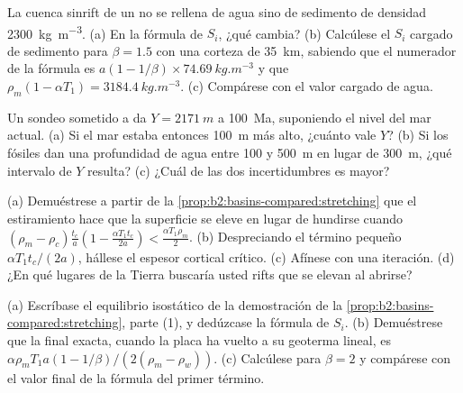\begin{exercise}[$\star\star$]\label{exo:b2:basins-compared:8}
La cuenca sinrift de un  no se rellena de agua sino de sedimento de densidad
\qty{2300}{kg.m^{-3}}. (a) En la fórmula de $S_i$, ¿qué cambia? (b) Calcúlese el $S_i$ cargado de sedimento
para $\beta = 1.5$ con una corteza de \qty{35}{km}, sabiendo que el numerador de la fórmula es
$a(1 - 1/\beta)\times\qty{74.69}{kg.m^{-3}}$ y que $\rho_m(1 - \alpha T_1) =
\qty{3184.4}{kg.m^{-3}}$. (c) Compárese con el valor cargado de agua.
\end{exercise}

\begin{exercise}[$\star\star$]\label{exo:b2:basins-compared:9}
Un sondeo sometido a  da $Y = \qty{2171}{m}$ a \qty{100}{Ma}, suponiendo el nivel del mar actual. (a)
Si el mar estaba entonces \qty{100}{m} más alto, ¿cuánto vale $Y$? (b) Si los fósiles dan una profundidad de agua
entre 100 y \qty{500}{m} en lugar de \qty{300}{m}, ¿qué intervalo de $Y$ resulta? (c) ¿Cuál de las
dos incertidumbres es mayor?
\end{exercise}

\begin{exercise}[$\star\star\star$]\label{exo:b2:basins-compared:10}
(a) Demuéstrese a partir de la \cref{prop:b2:basins-compared:stretching} que el estiramiento hace que la superficie se eleve
en lugar de hundirse cuando $(\rho_m - \rho_c)\frac{t_c}{a}\left(1 - \frac{\alpha T_1 t_c}{2a}\right) <
\frac{\alpha T_1\rho_m}{2}$. (b) Despreciando el término pequeño $\alpha T_1 t_c/(2a)$, hállese el
espesor cortical crítico. (c) Afínese con una iteración. (d) ¿En qué lugares de la Tierra buscaría usted
rifts que se elevan al abrirse?
\end{exercise}

\begin{exercise}[$\star\star\star$]\label{exo:b2:basins-compared:11}
(a) Escríbase el equilibrio isostático de la demostración de la \cref{prop:b2:basins-compared:stretching}, parte
(1), y dedúzcase la fórmula de $S_i$. (b) Demuéstrese que la  final exacta, cuando
la placa ha vuelto a su geoterma lineal, es $\alpha\rho_m T_1 a(1 - 1/\beta)/(2(\rho_m -
\rho_w))$. (c) Calcúlese para $\beta = 2$ y compárese con el valor final de la
fórmula del primer término.
\end{exercise}


